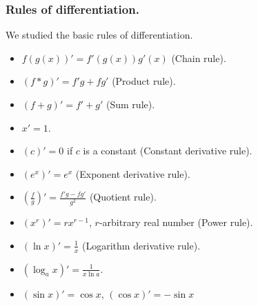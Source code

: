 \begin{frame}
\frametitle{Rules of differentiation.}
We studied the basic rules of differentiation.
\begin{itemize}
\item<1->\alert<12>{ $f (g(x))'=f'(g(x)) g'(x) $ (Chain rule). }
\item<2->\alert<12>{ $(f*g)'=f'g+fg'$ (Product rule).}
\item<3->\alert<12>{ $(f+g)'=f'+g'$ (Sum rule). }
\item<4->\alert<12>{ $x'=1$. }
\item<5->\alert<12>{ $(c)'=0$ if $c$ is a constant (Constant derivative rule).}
\end{itemize}
\begin{itemize}
\item<6->\alert<13>{ $(e^x)'=e^x$ (Exponent derivative rule).}
\item<7->\alert<13>{ $\left(\frac{f}{g}\right)'=\frac{f' g-f g' }{g^2}$ (Quotient rule).}
\item<8->\alert<13>{ $(x^r)'=rx^{r-1} $, $r$-arbitrary real number (Power rule).}
\item<9->\alert<13>{ $(\ln x)'=\frac{1}x$ (Logarithm derivative rule). }
\item<10->\alert<13>{ $(\log_a x)'=\frac{1}{x\ln a}$.}
\item<11->\alert<13>{ $(\sin x)'=\cos x$, $(\cos x)'=-\sin x$}
\end{itemize}

 
\end{frame}
